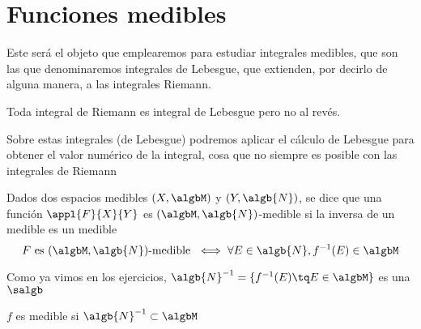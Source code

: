 \documentclass{apuntes}
\begin{document}
\chapter{Funciones medibles}
Este será el objeto que emplearemos para estudiar integrales medibles, que son las que denominaremos integrales de Lebesgue, que extienden, por decirlo de alguna manera, a las integrales Riemann.

Toda integral de Riemann es integral de Lebesgue pero no al revés.

Sobre estas integrales (de Lebesgue) podremos aplicar el cálculo de Lebesgue para obtener el valor numérico de la integral, cosa que no siempre es posible con las integrales de Riemann

\begin{defn}
Dados dos espacios medibles $(X, \algbM)$ y $(Y, \algb{N})$, se dice que una función $\appl{F}{X}{Y}$ es $(\algbM,\algb{N})$-medible si la inversa de un medible es un medible
\[F \text{ es }  (\algbM,\algb{N})\text{-medible } \iff \forall E \in \algb{N}, f^{-1}(E)\in \algbM\]
\end{defn}

Como ya vimos en los ejercicios, $\algb{N}^{-1}=\{f^{-1}(E) \tq E \in \algbM\}$ es una $\salgb$

\obs $f$ es medible si $\algb{N}^{-1} \subset \algbM$
\end{document}
